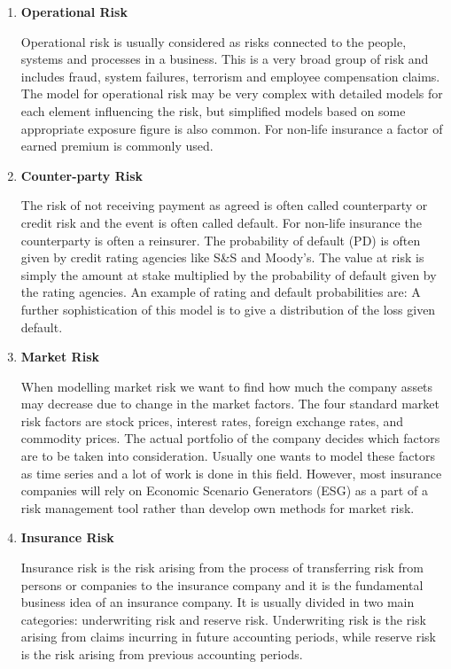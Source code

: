 \begin{enumerate}


\item \textbf{Operational Risk}
\par
Operational risk is usually considered as risks connected to the people, systems and processes in a business. This is a very broad group of risk and includes fraud, system failures, terrorism and employee compensation claims. The model for operational risk may be very complex with detailed models for each element influencing the risk, but simplified models based on some appropriate exposure figure is also common. For non-life insurance a factor of earned premium is commonly used.
\par
\item \textbf{Counter-party Risk}
\par
The risk of not receiving payment as agreed is often called counterparty or credit risk and the event is often called default. For non-life insurance the counterparty is often a reinsurer. The probability of default (PD) is often given by credit rating agencies like S\&S  and Moody’s. The value at risk is simply the amount at stake multiplied by the probability of default given by the rating agencies. An example of rating and default probabilities are: A further sophistication of this model is to give a distribution of the loss given default.
\par
\item \textbf{Market Risk}
\par
When modelling market risk we want to find how much the company assets may decrease due to change in the market factors. The four standard market risk factors are stock prices, interest rates, foreign exchange rates, and commodity prices. The actual portfolio of the company decides which factors are to be taken into consideration. Usually one wants to model these factors as time series and a lot of work is done in this field. However, most insurance companies will rely on Economic Scenario Generators (ESG) as a part of a risk management tool rather than develop own methods for market risk.


\item \textbf{Insurance Risk}
\par
Insurance risk is the risk arising from the process of transferring risk from persons or companies to the insurance company and it is the fundamental business idea of an insurance company. It is usually divided in two main categories: underwriting risk and reserve risk. Underwriting risk is the risk arising from claims incurring in future accounting periods, while reserve risk is the risk arising from previous accounting periods.


\end{enumerate}
